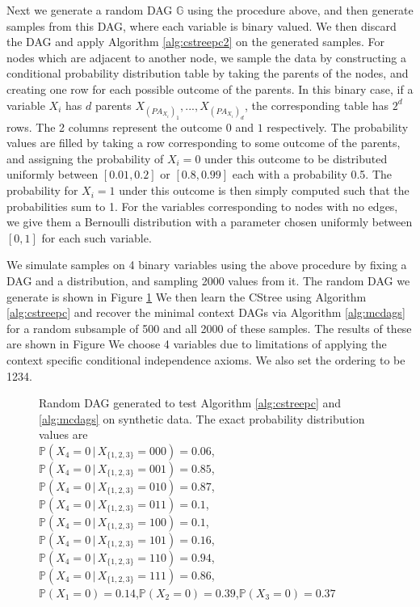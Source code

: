 \documentclass{tufte-book}
\begin{document}
Next we generate a random DAG \(\mathbb{G}\) using the procedure above, and then generate samples from this DAG, where each variable is binary valued. We then discard the DAG and apply Algorithm \ref{alg:cstreepc2} on the generated samples. For nodes which are adjacent to another node, we sample the data by constructing a conditional probability distribution table by taking the parents of the nodes, and creating one row for each possible outcome of the parents. In this binary case, if a variable \(X_i\) has \(d\) parents \(X_{(PA_{X_i})_1},...,X_{(PA_{X_i})_d}\), the corresponding table has \(2^d\) rows. The 2 columns represent the outcome \(0\) and \(1\) respectively. The probability values are filled by taking a row corresponding to some outcome of the parents, and assigning the probability of \(X_i=0\) under this outcome to be distributed uniformly between \([0.01,0.2]\) or \([0.8,0.99]\) each with a probability 0.5. The probability for \(X_i=1\) under this outcome is then simply computed such that the probabilities sum to 1. For the variables corresponding to nodes with no edges, we give them a Bernoulli distribution with a parameter chosen uniformly between \([0,1]\) for each such variable.



We simulate samples on 4 binary variables using the above procedure by fixing a DAG and a distribution, and sampling 2000 values from it. The random DAG we generate is shown in Figure \ref{fig:syntheticdag} We then learn the CStree using Algorithm \ref{alg:cstreepc} and recover the minimal context DAGs via Algorithm \ref{alg:mcdags} for a random subsample of 500 and all 2000 of these samples. The results of these are shown in Figure  We choose 4 variables due to limitations of applying the context specific conditional independence axioms. We also set the ordering to be 1234.

\begin{figure}[]\label{fig:syntheticdag}
 \centering
{}%
\caption{Random DAG generated to test Algorithm \ref{alg:cstreepc} and \ref{alg:mcdags} on synthetic data. The exact probability distribution values are\\ $\mathbb{P}(X_4=0\,|\,X_{\{1,2,3\}}=000)=0.06$,\\ $\mathbb{P}(X_4=0\,|\,X_{\{1,2,3\}}=001)=0.85$,\\
$\mathbb{P}(X_4=0\,|\,X_{\{1,2,3\}}=010)=0.87$,\\ $\mathbb{P}(X_4=0\,|\,X_{\{1,2,3\}}=011)=0.1$,\\
$\mathbb{P}(X_4=0\,|\,X_{\{1,2,3\}}=100)=0.1$,\\ $\mathbb{P}(X_4=0\,|\,X_{\{1,2,3\}}=101)=0.16$,\\
$\mathbb{P}(X_4=0\,|\,X_{\{1,2,3\}}=110)=0.94$,\\
$\mathbb{P}(X_4=0\,|\,X_{\{1,2,3\}}=111)=0.86$,\\
$\mathbb{P}(X_1=0)=0.14$,$\mathbb{P}(X_2=0)=0.39$,$\mathbb{P}(X_3=0)=0.37$}

\end{figure}
\end{document}
